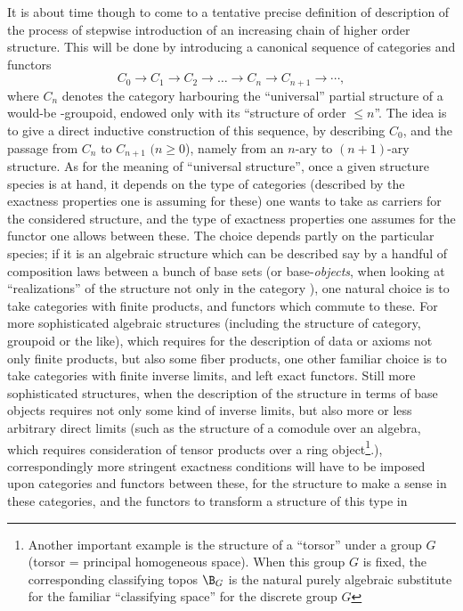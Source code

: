 \label{sec:5}%
It is about time though to come to a tentative precise definition of
description of the process of stepwise introduction of an increasing
chain of higher order structure. This will be done by introducing a
canonical sequence of categories and functors
\[ C_0 \to C_1 \to C_2 \to \dots \to C_n \to C_{n+1} \to \cdots,\]
where $C_n$ denotes the category harbouring the ``universal''
partial structure of a would-be \oo-groupoid, endowed only with its
``structure of order $\le n$''. The idea is to give a direct inductive
construction of this sequence, by describing $C_0$, and the passage
from $C_n$ to $C_{n+1}$ $(n\ge0$), namely from an $n$-ary to
$(n+1)$-ary structure. As for the meaning of ``universal structure'',
once a given structure species is at hand, it depends on the type of
categories (described by the exactness properties one is assuming for
these) one wants to take as carriers for the considered structure, and
the type of exactness properties one assumes for the functor one
allows between these. The choice depends partly on the particular
species; if it is an algebraic structure which can be described say by
a handful of composition laws between a bunch of base sets (or
base-\emph{objects}, when looking at ``realizations'' of the structure not
only in the category \Sets), one natural choice is to take categories
with finite products, and functors which commute to these. For more
sophisticated algebraic structures (including the structure of
category, groupoid or the like), which requires for the description of
data or axioms not only finite products, but also some fiber products,
one other familiar choice is to take categories with finite inverse
limits, and left exact functors. Still more sophisticated structures,
when the description of the structure in terms of base objects
requires not only some kind of inverse limits, but also more or less
arbitrary direct limits (such as the structure of a comodule over an
algebra, which requires consideration of tensor products over a ring
object\footnote{Another important example is the structure of a ``torsor'' under a group $G$ (torsor = principal homogeneous space). When this group $G$ is fixed, the corresponding classifying topos $\B_G$ is the natural purely algebraic substitute for the familiar ``classifying space'' for the discrete group $G$}.), correspondingly more
stringent exactness conditions will have to be imposed upon categories and
functors between these, for the structure to make a sense in these
categories, and the functors to transform a structure of this type in
